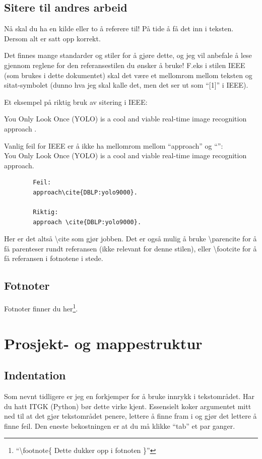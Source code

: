         
    \subsection{Sitere til andres arbeid}
        Nå skal du ha en kilde eller to å referere til! På tide å få det inn i teksten. Dersom alt er satt opp korrekt.
        
        Det finnes mange standarder og stiler for å gjøre dette, og jeg vil anbefale å lese gjennom reglene for den referansestilen du ønsker å bruke! F.eks i stilen IEEE (som brukes i dette dokumentet) skal det være et mellomrom mellom teksten og sitat-symbolet (dunno hva jeg skal kalle det, men det ser ut som ``[1]'' i IEEE). 
        
        Et eksempel på riktig bruk av sitering i IEEE:
        
        You Only Look Once (YOLO) is a cool and viable real-time image recognition approach \cite{DBLP:yolo9000}. 
        
        Vanlig feil for IEEE er å ikke ha mellomrom mellom ``approach'' og ``\cite{DBLP:yolo9000}'':\\
        You Only Look Once (YOLO) is a cool and viable real-time image recognition approach\cite{DBLP:yolo9000}.
        
        \begin{verbatim}
        Feil:
        approach\cite{DBLP:yolo9000}. 
        
        Riktig:
        approach \cite{DBLP:yolo9000}. 
        \end{verbatim}
        
        Her er det altså \textbackslash cite som gjør jobben. Det er også mulig å bruke \textbackslash parencite for å få parenteser rundt referansen (ikke relevant for denne stilen), eller \textbackslash footcite for å få referansen i fotnotene i stede.
        
        
    \subsection{Fotnoter}
        Fotnoter finner du her\footnote{``\textbackslash footnote\{ Dette dukker opp i fotnoten \}''}.
        
        

\section{Prosjekt- og mappestruktur}
    \subsection{Indentation}
        Som nevnt tidligere er jeg en forkjemper for å bruke innrykk i tekstområdet. Har du hatt ITGK (Python) bør dette virke kjent. Essensielt koker argumentet mitt ned til at det gjør tekstområdet penere, lettere å finne fram i og gjør det lettere å finne feil. Den eneste bekostningen er at du må klikke ``tab'' et par ganger.
        

